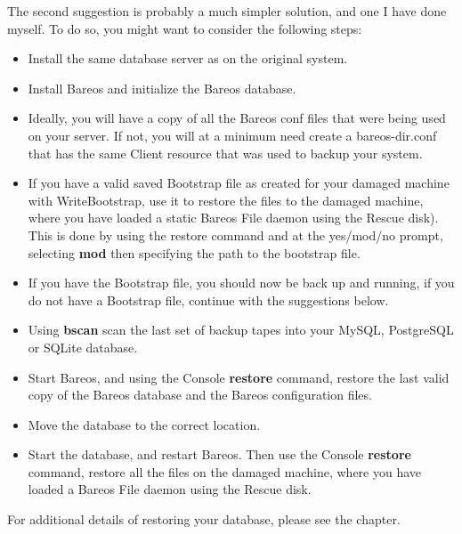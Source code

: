 The second suggestion is probably a much simpler solution, and one I have done
myself. To do so, you might want to consider the following steps:

\begin{itemize}
\item Install the same database server as on the original system.
\item Install Bareos and initialize the Bareos database.
\item Ideally, you will have a copy of all the Bareos conf files that
   were being used on your server. If not, you will at a minimum need
   create a bareos-dir.conf that has the same Client resource that
   was used to backup your system.
\item If you have a valid saved Bootstrap file as created for your damaged
   machine with WriteBootstrap, use it to restore the files to the damaged
   machine, where you have loaded a static Bareos File daemon using the
   Rescue disk).  This is done by using the restore command and at
   the yes/mod/no prompt, selecting {\bf mod} then specifying the path to
   the bootstrap file.
\item If you have the Bootstrap file, you should now be back up and  running,
   if you do not have a Bootstrap file, continue with the  suggestions below.
\item Using {\bf bscan} scan the last set of backup tapes into your  MySQL,
   PostgreSQL or SQLite database.
\item Start Bareos, and using the Console {\bf restore} command,  restore the
   last valid copy of the Bareos database and the Bareos configuration
   files.
\item Move the database to the correct location.
\item Start the database, and restart Bareos. Then use the Console {\bf
   restore} command, restore all the files  on the damaged machine, where you
   have loaded a Bareos File  daemon using the Rescue disk.
\end{itemize}

For additional details of restoring your database, please see the
 chapter.


